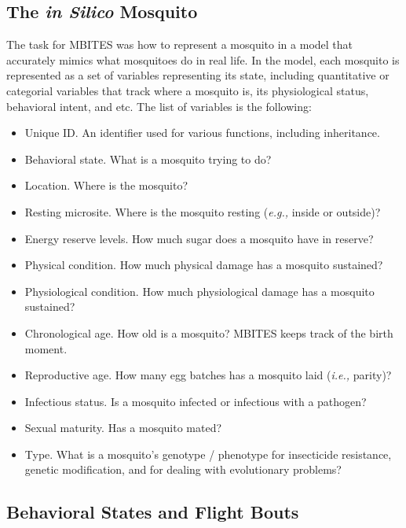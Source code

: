 \documentclass{article}
\newcommand{\eg}{{\em e.g., }}
\newcommand{\ie}{{\em i.e., }}
\begin{document}
\subsection{The {\em in Silico} Mosquito}

The task for MBITES was how to represent a mosquito in a model that accurately mimics what mosquitoes do in real life. In the model, each mosquito is represented as a set of variables representing its state, including quantitative or categorial variables that track where a mosquito is, its physiological status, behavioral intent, and etc. The list of variables is the following: 
%
\begin{itemize}
\item Unique ID. An identifier used for various functions, including inheritance.
\item Behavioral state. What is a mosquito trying to do?
\item Location. Where is the mosquito? 
\item Resting microsite. Where is the mosquito resting (\eg inside or outside)?
\item Energy reserve levels. How much sugar does a mosquito have in reserve? 
\item Physical condition. How much physical damage has a mosquito sustained? 
\item Physiological condition. How much physiological damage has a mosquito sustained?
\item Chronological age. How old is a mosquito? MBITES keeps track of the birth moment. 
\item Reproductive age. How many egg batches has a mosquito laid (\ie parity)? 
\item Infectious status. Is a mosquito infected or infectious with a pathogen? 
\item Sexual maturity. Has a mosquito mated? 
\item Type. What is a mosquito's genotype / phenotype for insecticide resistance, genetic modification, and for dealing with evolutionary problems? 
\end{itemize}

\subsection{Behavioral States and Flight Bouts}
\end{document}

